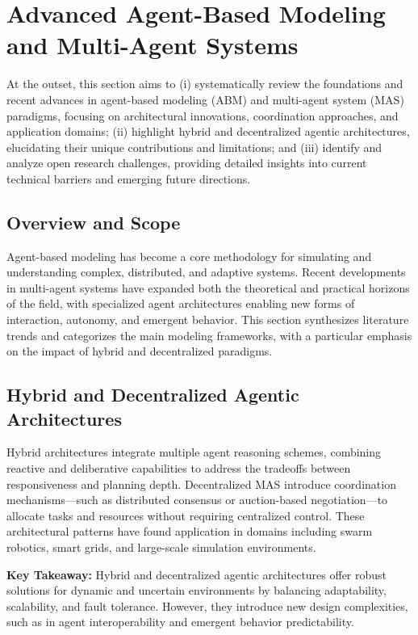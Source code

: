 \documentclass[sigconf]{acmart}
\begin{document}
\section{Advanced Agent-Based Modeling and Multi-Agent Systems}

At the outset, this section aims to (i) systematically review the foundations and recent advances in agent-based modeling (ABM) and multi-agent system (MAS) paradigms, focusing on architectural innovations, coordination approaches, and application domains; (ii) highlight hybrid and decentralized agentic architectures, elucidating their unique contributions and limitations; and (iii) identify and analyze open research challenges, providing detailed insights into current technical barriers and emerging future directions.

\subsection{Overview and Scope}

Agent-based modeling has become a core methodology for simulating and understanding complex, distributed, and adaptive systems. Recent developments in multi-agent systems have expanded both the theoretical and practical horizons of the field, with specialized agent architectures enabling new forms of interaction, autonomy, and emergent behavior. This section synthesizes literature trends and categorizes the main modeling frameworks, with a particular emphasis on the impact of hybrid and decentralized paradigms.

\subsection{Hybrid and Decentralized Agentic Architectures}

Hybrid architectures integrate multiple agent reasoning schemes, combining reactive and deliberative capabilities to address the tradeoffs between responsiveness and planning depth. Decentralized MAS introduce coordination mechanisms—such as distributed consensus or auction-based negotiation—to allocate tasks and resources without requiring centralized control. These architectural patterns have found application in domains including swarm robotics, smart grids, and large-scale simulation environments.

\textbf{Key Takeaway:} Hybrid and decentralized agentic architectures offer robust solutions for dynamic and uncertain environments by balancing adaptability, scalability, and fault tolerance. However, they introduce new design complexities, such as in agent interoperability and emergent behavior predictability.
\end{document}
